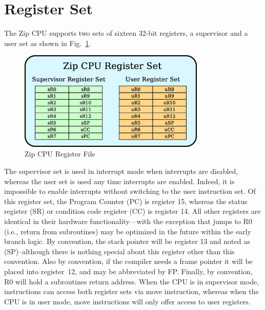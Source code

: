 \documentclass{gqtekspec}
\begin{document}
\section{Register Set}
The Zip CPU supports two sets of sixteen 32-bit registers, a supervisor
and a user set as shown in Fig.~\ref{fig:regset}. 
\begin{figure}\begin{center}
\includegraphics[width=3.5in]{../gfx/regset.eps}
\caption{Zip CPU Register File}\label{fig:regset}
\end{center}\end{figure}
The supervisor set is used in interrupt mode when interrupts are disabled,
whereas the user set is used any time interrupts are enabled.  Indeed, it is
impossible to enable interrupts without switching to the user instruction
set.  Of this register set, the Program Counter (PC) is register 15, whereas
the status register (SR) or condition code register (CC) is register 14.  All
other registers are identical in their hardware functionality---with the
exception that jumps to R0 (i.e., return from subroutines) may be optimized in
the future within the early branch logic.
By convention, the stack pointer will be register 13 and
noted as (SP)--although there is nothing special about this register other
than this convention.  Also by convention, if the compiler needs a frame pointer
it will be placed into register~12, and may be abbreviated by FP.  Finally,
by convention, R0 will hold a subroutines return address.
When the CPU is in supervisor mode, instructions can access both register sets
via move instruction, whereas when the CPU is in user mode, move instructions
will only offer access to user registers.
\end{document}
